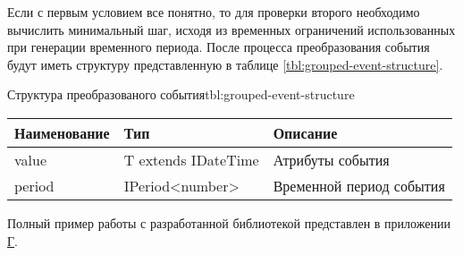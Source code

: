 Если с первым условием все понятно, то для проверки второго необходимо вычислить минимальный шаг, исходя из временных ограничений использованных при генерации временного периода.
После процесса преобразования события будут иметь структуру представленную в таблице \ref{tbl:grouped-event-structure}.

\begin{tbl}{Структура преобразованого события}{tbl:grouped-event-structure}
  \begin{tabularx}{\textwidth}{| p{3cm} | p{4cm} | X |}
    \hline Наименование & Тип                  & Описание                 \\
    \hline value        & T extends IDateTime  & Атрибуты события         \\
    \hline period       & IPeriod<number>      & Временной период события \\
    \hline
    \end{tabularx}
\end{tbl}

Полный пример работы с разработанной библиотекой представлен в приложении \hyperlink{app:D}{Г}.
